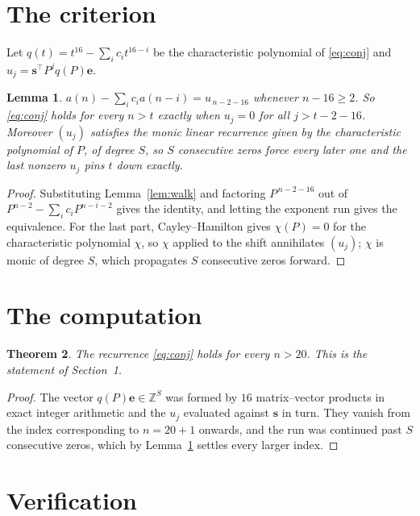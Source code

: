 \documentclass[11pt,a4paper]{article}
\theoremstyle{plain}
\newtheorem{theorem}{Theorem}
\newtheorem{lemma}[theorem]{Lemma}
\theoremstyle{definition}
\begin{document}
\section{The criterion}

Let $q(t)=t^{16}-\sum_i c_i t^{16-i}$ be the characteristic polynomial of
\eqref{eq:conj} and $u_j=\mathbf{s}^{\!\top}P^{j}q(P)\mathbf{e}$.

\begin{lemma}\label{lem:crit}
$a(n)-\sum_i c_i a(n-i)=u_{\,n-2-16}$ whenever $n-16\ge2$. So \eqref{eq:conj}
holds for every $n>t$ exactly when $u_j=0$ for all $j>t-2-16$. Moreover $(u_j)$
satisfies the monic linear recurrence given by the characteristic polynomial of $P$, of
degree $S$, so $S$ consecutive zeros force every later one and the last nonzero $u_j$ pins
$t$ down exactly.
\end{lemma}

\begin{proof}
Substituting Lemma~\ref{lem:walk} and factoring $P^{\,n-2-16}$ out of
$P^{n-2}-\sum_i c_i P^{n-i-2}$ gives the identity, and letting the exponent run gives the
equivalence. For the last part, Cayley--Hamilton gives $\chi(P)=0$ for the characteristic
polynomial $\chi$, so $\chi$ applied to the shift annihilates $(u_j)$; $\chi$ is monic of
degree $S$, which propagates $S$ consecutive zeros forward.
\end{proof}

\section{The computation}

\begin{theorem}
The recurrence \eqref{eq:conj} holds for every $n>20$. This is the statement of
Section~1.
\end{theorem}

\begin{proof}
The vector $q(P)\mathbf{e}\in\mathbb{Z}^{S}$ was formed by $16$ matrix--vector
products in exact integer arithmetic and the $u_j$ evaluated against $\mathbf{s}$ in turn.
They vanish from the index corresponding to $n=20+1$ onwards, and the run was continued
past $S$ consecutive zeros, which by Lemma~\ref{lem:crit} settles every larger index.
\end{proof}

\section{Verification}
\end{document}
